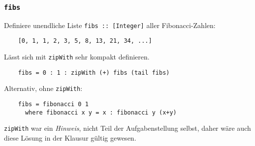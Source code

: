\documentclass{beamer}
\date{2016-11-14/15}
\begin{document}
\normalsize
\normalem

\begin{frame}[plain]
  \titlepage
\end{frame}

\begin{frame}[fragile]
  \frametitle{\lstinline{fibs}}
  Definiere unendliche Liste \lstinline{fibs :: [Integer]} aller Fibonacci-Zahlen:
  \begin{lstlisting}
    [0, 1, 1, 2, 3, 5, 8, 13, 21, 34, ...]
  \end{lstlisting}
  Lässt sich mit \lstinline{zipWith} sehr kompakt definieren.
  \pause
  \begin{lstlisting}
    fibs = 0 : 1 : zipWith (+) fibs (tail fibs)
  \end{lstlisting}
  Alternativ, ohne \lstinline{zipWith}:
  \begin{lstlisting}
    fibs = fibonacci 0 1
      where fibonacci x y = x : fibonacci y (x+y)
  \end{lstlisting}
  \lstinline{zipWith} war ein \emph{Hinweis}, nicht Teil der Aufgabenstellung selbst, daher wäre auch diese Lösung in der Klausur gültig gewesen.
\end{frame}
\end{document}
